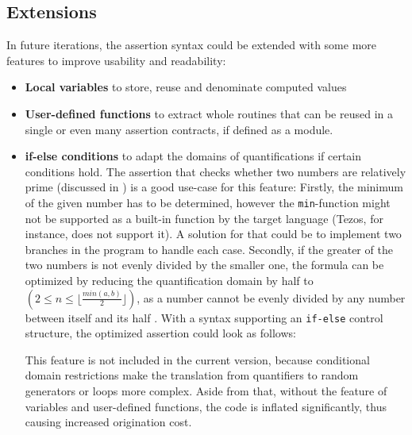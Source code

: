 \subsection{Extensions}
In future iterations, the assertion syntax could be extended with some more features to improve usability and readability:
\begin{itemize}
\item \textbf{Local variables} to store, reuse and denominate computed values
\item \textbf{User-defined functions} to extract whole routines that can be reused in a single or even many assertion contracts, if defined as a module.
\item \textbf{if-else conditions} to adapt the domains of quantifications if certain conditions hold. The assertion that checks whether two numbers are relatively prime (discussed in ) is a good use-case for this feature: Firstly, the minimum of the given number has to be determined, however the \texttt{min}-function might not be supported as a built-in function by the target language (Tezos, for instance, does not support it). A solution for that could be to implement two branches in the program to handle each case. Secondly, if the greater of the two numbers is not evenly divided by the smaller one, the formula can be optimized by reducing the quantification domain by half to $(2 \le n \le \lfloor \frac{min(a,b)}{2} \rfloor)$, as a number cannot be evenly divided by any number between itself and its half \cite{bernhardt_veigel_2020}. With a syntax supporting an \texttt{if-else} control structure, the optimized assertion could look as follows:

This feature is not included in the current version, because conditional domain restrictions make the translation from quantifiers to random generators or loops more complex. Aside from that, without the feature of variables and user-defined functions, the code is inflated significantly, thus causing increased origination cost.
\end{itemize}

